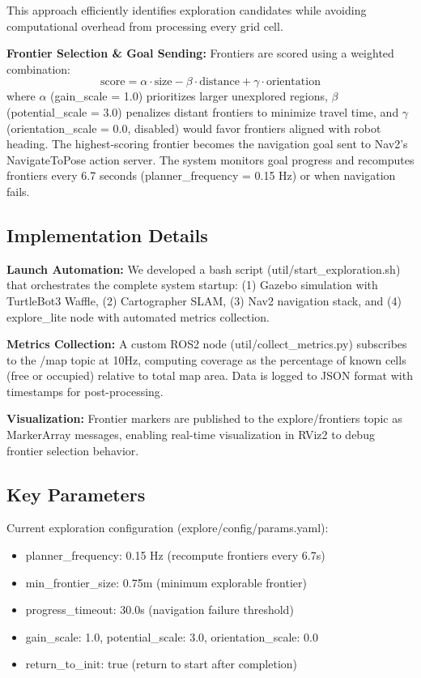 \documentclass[conference]{IEEEtran}
\begin{document}
This approach efficiently identifies exploration candidates while avoiding computational overhead from processing every grid cell.

\textbf{Frontier Selection \& Goal Sending:} Frontiers are scored using a weighted combination:
\begin{equation}
    \text{score} = \alpha \cdot \text{size} - \beta \cdot \text{distance} + \gamma \cdot \text{orientation}
\end{equation}
where $\alpha$ (gain\_scale = 1.0) prioritizes larger unexplored regions, $\beta$ (potential\_scale = 3.0) penalizes distant frontiers to minimize travel time, and $\gamma$ (orientation\_scale = 0.0, disabled) would favor frontiers aligned with robot heading. The highest-scoring frontier becomes the navigation goal sent to Nav2's NavigateToPose action server. The system monitors goal progress and recomputes frontiers every 6.7 seconds (planner\_frequency = 0.15 Hz) or when navigation fails.

\subsection{Implementation Details}

\textbf{Launch Automation:} We developed a bash script (util/start\_exploration.sh) that orchestrates the complete system startup: (1) Gazebo simulation with TurtleBot3 Waffle, (2) Cartographer SLAM, (3) Nav2 navigation stack, and (4) explore\_lite node with automated metrics collection.

\textbf{Metrics Collection:} A custom ROS2 node (util/collect\_metrics.py) subscribes to the /map topic at 10Hz, computing coverage as the percentage of known cells (free or occupied) relative to total map area. Data is logged to JSON format with timestamps for post-processing.

\textbf{Visualization:} Frontier markers are published to the explore/frontiers topic as MarkerArray messages, enabling real-time visualization in RViz2 to debug frontier selection behavior.

\subsection{Key Parameters}

Current exploration configuration (explore/config/params.yaml):
\begin{itemize}
    \item planner\_frequency: 0.15 Hz (recompute frontiers every 6.7s)
    \item min\_frontier\_size: 0.75m (minimum explorable frontier)
    \item progress\_timeout: 30.0s (navigation failure threshold)
    \item gain\_scale: 1.0, potential\_scale: 3.0, orientation\_scale: 0.0
    \item return\_to\_init: true (return to start after completion)
\end{itemize}
\end{document}
